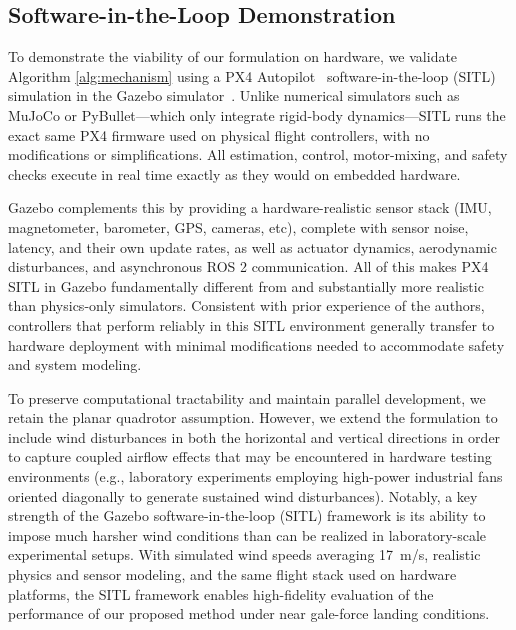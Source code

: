 \documentclass{IEEEojcsys}
\begin{document}
\subsection{Software-in-the-Loop Demonstration}
To demonstrate the viability of our formulation on hardware, we validate Algorithm \ref{alg:mechanism} using a PX4 Autopilot~\cite{PX4} software-in-the-loop (SITL) simulation in the Gazebo simulator~\cite{Gazebo}. 
Unlike numerical simulators such as MuJoCo or PyBullet—which only integrate rigid-body dynamics—SITL runs the exact same PX4 firmware used on physical flight controllers, with no modifications or simplifications. All estimation, control, motor-mixing, and safety checks execute in real time exactly as they would on embedded hardware.

Gazebo complements this by providing a hardware-realistic sensor stack (IMU, magnetometer, barometer, GPS, cameras, etc), complete with sensor noise, latency, and their own update rates, as well as actuator dynamics, aerodynamic disturbances, and asynchronous ROS 2 communication. All of this makes PX4 SITL in Gazebo fundamentally different from and substantially more realistic than physics-only simulators. Consistent with prior experience of the authors, controllers that perform reliably in this SITL environment generally transfer to hardware deployment with minimal modifications needed to accommodate safety and system modeling.

To preserve computational tractability and maintain parallel development, we retain the planar quadrotor assumption. However, we extend the formulation to include wind disturbances in both the horizontal and vertical directions in order to capture coupled airflow effects that may be encountered in hardware testing environments (e.g., laboratory experiments employing high-power industrial fans oriented diagonally to generate sustained wind disturbances). Notably, a key strength of the Gazebo software-in-the-loop (SITL) framework is its ability to impose much harsher wind conditions than can be realized in laboratory-scale experimental setups. With simulated wind speeds averaging \qty{17}{m/s}, realistic physics and sensor modeling, and the same flight stack used on hardware platforms, the SITL framework enables high-fidelity evaluation of the performance of our proposed method under near gale-force landing conditions.
\end{document}

